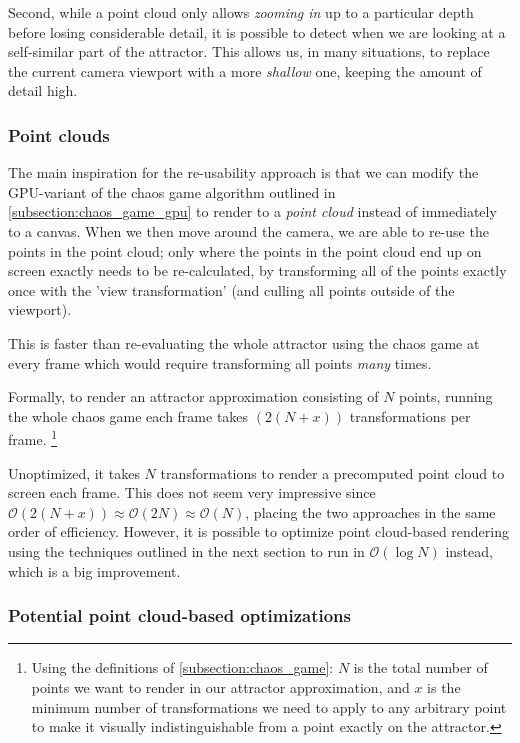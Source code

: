 \documentclass[11pt]{article}
\begin{document}
Second, while a point cloud only allows \emph{zooming in} up to a particular depth before losing considerable detail, 
it is possible to detect when we are looking at a self-similar part of the attractor.
This allows us, in many situations, to replace the current camera viewport with a more \emph{shallow} one, keeping the amount of detail high.

\subsubsection{Point clouds}
\label{sec:org85e6b69}

The main inspiration for the re-usability approach is that we can modify the GPU-variant of the chaos game algorithm outlined in \autoref{subsection:chaos_game_gpu}
to render to a \emph{point cloud} instead of immediately to a canvas.
When we then move around the camera, we are able to re-use the points in the point cloud;
only where the points in the point cloud end up on screen exactly needs to be re-calculated, 
by transforming all of the points exactly once with the 'view transformation' 
(and culling all points outside of the viewport).

This is faster than re-evaluating the whole attractor using the chaos game at every frame which would require transforming all points \emph{many} times.

Formally, to render an attractor approximation consisting of \(N\) points, 
running the whole chaos game each frame takes \((2(N+x))\) transformations per frame. \footnote{Using the definitions of \autoref{subsection:chaos_game}: \(N\) is the total number of points we want to render in our attractor approximation, 
and \(x\) is the minimum number of transformations we need to apply to any arbitrary point to make it visually indistinguishable from a point exactly on the attractor.}

Unoptimized, it takes \(N\) transformations to render a precomputed point cloud to screen each frame.
This does not seem very impressive since \(\mathcal{O}(2(N+x)) \approx \mathcal{O}(2N) \approx \mathcal{O}(N)\),
placing the two approaches in the same order of efficiency. However, it is possible to optimize point cloud-based rendering using the techniques outlined in the next section
to run in \(\mathcal{O}(\log{N})\) instead, which is a big improvement.

\subsubsection{Potential point cloud-based optimizations}
\label{sec:org10cd42b}
\label{subsection:point_cloud_optimizations}
\end{document}
